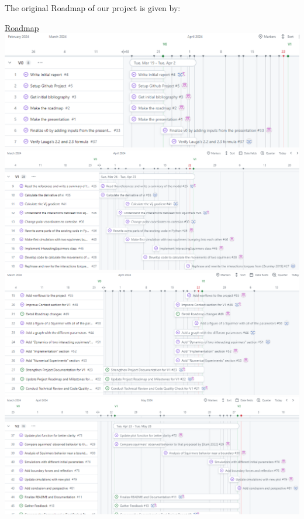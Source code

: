 \documentclass{article}
\begin{document}
The original Roadmap of our project is given by:
\begin{center}
    \href{https://github.com/orgs/master-csmi/projects/23/views/2}{Roadmap}
    \includegraphics[width=1.2\textwidth]{Presentation/images/roadmapV0_1.png}
    \vspace{1em} %
    \includegraphics[width=1.2\textwidth]{Presentation/images/roadmapV1_1.png}
    \vspace{1em} %
    \includegraphics[width=1.2\textwidth]{Presentation/images/roadmapV1_2.png}
    \vspace{1em} %
    \includegraphics[width=1.2\textwidth]{Presentation/images/roadmapV2.png}
\end{center}
\end{document}
